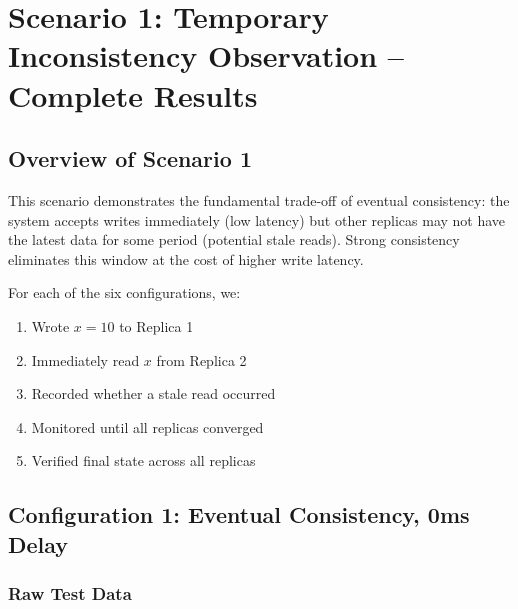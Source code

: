 \documentclass[10pt,a4paper]{article}
\begin{document}
\newpage


\section{Scenario 1: Temporary Inconsistency Observation -- Complete Results}

\subsection{Overview of Scenario 1}

This scenario demonstrates the fundamental trade-off of eventual consistency: the system accepts writes immediately (low latency) but other replicas may not have the latest data for some period (potential stale reads). Strong consistency eliminates this window at the cost of higher write latency.

For each of the six configurations, we:
\begin{enumerate}
    \item Wrote $x=10$ to Replica 1
    \item Immediately read $x$ from Replica 2
    \item Recorded whether a stale read occurred
    \item Monitored until all replicas converged
    \item Verified final state across all replicas
\end{enumerate}

\subsection{Configuration 1: Eventual Consistency, 0ms Delay}

\subsubsection{Raw Test Data}
\end{document}

